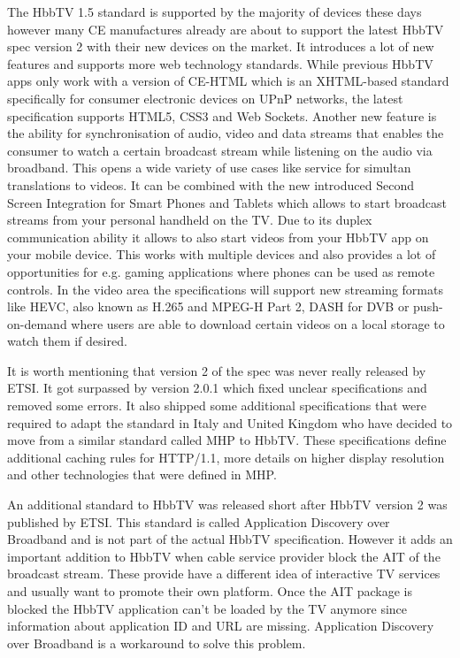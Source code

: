 The HbbTV 1.5 standard is supported by the majority of devices these days however many CE manufactures
already are about to support the latest HbbTV spec version 2 with their new devices on the market.
It introduces a lot of new features and supports more web technology standards. While previous HbbTV
apps only work with a version of CE-HTML which is an XHTML-based standard specifically for consumer
electronic devices on UPnP networks, the latest specification supports HTML5, CSS3 and Web Sockets.
Another new feature is the ability for synchronisation of audio, video and data streams that enables
the consumer to watch a certain broadcast stream while listening on the audio via broadband. This
opens a wide variety of use cases like service for simultan translations to videos. It can be
combined with the new introduced Second Screen Integration for Smart Phones and Tablets which
allows to start broadcast streams from your personal handheld on the TV. Due to its duplex
communication ability it allows to also start videos from your HbbTV app on your mobile device.
This works with multiple devices and also provides a lot of opportunities for e.g. gaming applications
where phones can be used as remote controls. In the video area the specifications will support
new streaming formats like HEVC, also known as H.265 and MPEG-H Part 2, DASH for DVB or
push-on-demand where users are able to download certain videos on a local storage to watch them
if desired.

It is worth mentioning that version 2 of the spec was never really released by ETSI. It got
surpassed by version 2.0.1 which fixed unclear specifications and removed some errors. It also
shipped some additional specifications that were required to adapt the standard in Italy and United
Kingdom who have decided to move from a similar standard called MHP to HbbTV. These specifications
define additional caching rules for HTTP/1.1, more details on higher display resolution and other
technologies that were defined in MHP.

An additional standard to HbbTV was released short after HbbTV version 2 was published by ETSI.
This standard is called Application Discovery over Broadband and is not part of the actual
HbbTV specification. However it adds an important addition to HbbTV when cable service provider block
the AIT of the broadcast stream. These provide have a different idea of interactive TV services
and usually want to promote their own platform. Once the AIT package is blocked the HbbTV application
can't be loaded by the TV anymore since information about application ID and URL are missing.
Application Discovery over Broadband is a workaround to solve this problem.

